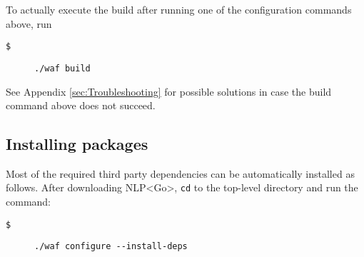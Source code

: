 To actually execute the build after running one of the configuration
commands above, run 
\begin{description}
\item [{\texttt{\$}}] \texttt{./waf build}
\end{description}
See Appendix \ref{sec:Troubleshooting} for possible solutions in
case the build command above does not succeed.

\subsection{Installing packages}

Most of the required third party dependencies can be automatically
installed as follows. After downloading NLP<Go>, \texttt{cd} to the
top-level directory and run the command:
\begin{description}
\item [{\texttt{\$}}] \texttt{./waf configure -{}-install-deps }
\end{description}
